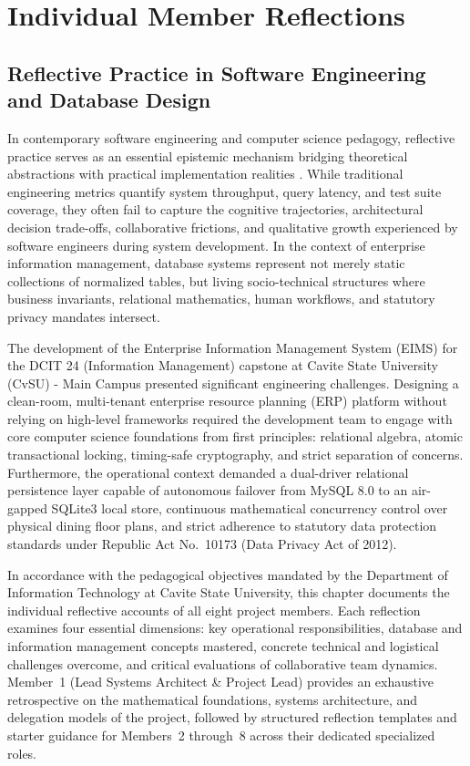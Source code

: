 \chapter{Individual Member Reflections}
\label{chap:reflections}

\section{Reflective Practice in Software Engineering and Database Design}
\label{sec:reflections_intro}

In contemporary software engineering and computer science pedagogy, reflective practice serves as an essential epistemic mechanism bridging theoretical abstractions with practical implementation realities \parencite{schon1983reflective, gibbs1988learning}. While traditional engineering metrics quantify system throughput, query latency, and test suite coverage, they often fail to capture the cognitive trajectories, architectural decision trade-offs, collaborative frictions, and qualitative growth experienced by software engineers during system development. In the context of enterprise information management, database systems represent not merely static collections of normalized tables, but living socio-technical structures where business invariants, relational mathematics, human workflows, and statutory privacy mandates intersect.

The development of the Enterprise Information Management System (EIMS) for the DCIT 24 (Information Management) capstone at Cavite State University (CvSU) - Main Campus presented significant engineering challenges. Designing a clean-room, multi-tenant enterprise resource planning (ERP) platform without relying on high-level frameworks required the development team to engage with core computer science foundations from first principles: relational algebra, atomic transactional locking, timing-safe cryptography, and strict separation of concerns. Furthermore, the operational context demanded a dual-driver relational persistence layer capable of autonomous failover from MySQL 8.0 to an air-gapped SQLite3 local store, continuous mathematical concurrency control over physical dining floor plans, and strict adherence to statutory data protection standards under Republic Act No.~10173 (Data Privacy Act of 2012).

In accordance with the pedagogical objectives mandated by the Department of Information Technology at Cavite State University, this chapter documents the individual reflective accounts of all eight project members. Each reflection examines four essential dimensions: key operational responsibilities, database and information management concepts mastered, concrete technical and logistical challenges overcome, and critical evaluations of collaborative team dynamics. Member~1 (Lead Systems Architect \& Project Lead) provides an exhaustive retrospective on the mathematical foundations, systems architecture, and delegation models of the project, followed by structured reflection templates and starter guidance for Members~2 through~8 across their dedicated specialized roles.

